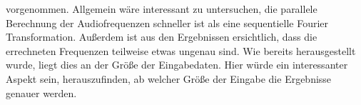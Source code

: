 vorgenommen. Allgemein wäre interessant zu untersuchen, die parallele Berechnung der Audiofrequenzen schneller ist als eine sequentielle Fourier Transformation. Außerdem ist aus den Ergebnissen ersichtlich, dass die errechneten Frequenzen teilweise etwas ungenau sind. Wie bereits herausgestellt wurde, liegt dies an der Größe der Eingabedaten. Hier würde ein interessanter Aspekt sein, herauszufinden, ab welcher Größe der Eingabe die Ergebnisse genauer werden. 